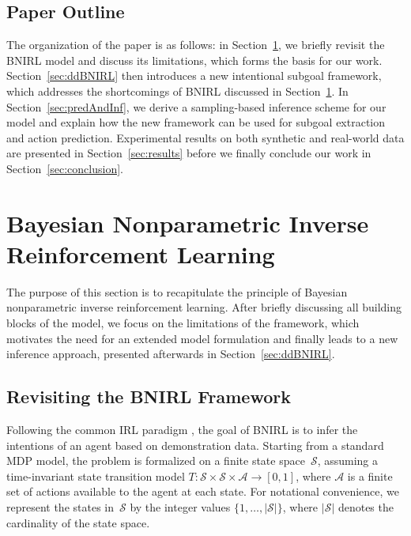 \documentclass[twoside,11pt]{article}
\begin{document}
\subsection{Paper Outline}
%
The organization %
of the %
paper is as follows: in Section~\ref{sec:BNIRL}, we briefly revisit the BNIRL model and discuss its limitations, which forms the basis for our work. %
Section~\ref{sec:ddBNIRL} then introduces a new intentional subgoal framework, which addresses the %
shortcomings of BNIRL discussed in Section~\ref{sec:BNIRL}. In Section~\ref{sec:predAndInf}, we derive a sampling-based inference scheme for our model and explain %
how the new framework can be used for subgoal extraction and action prediction. Experimental results on both synthetic and real-world data are presented in Section~\ref{sec:results} before we finally conclude our work in Section~\ref{sec:conclusion}.



\section{Bayesian Nonparametric Inverse Reinforcement Learning}
\label{sec:BNIRL}

The purpose of this section is to recapitulate the principle of Bayesian nonparametric inverse reinforcement learning. After briefly discussing all building blocks of the model, we focus on the limitations of the framework, which motivates the need for an extended model formulation and finally leads to a new inference approach, presented afterwards in Section~\ref{sec:ddBNIRL}.

%
%
%
%
%
%
%
%
%
%
%
%
%
%
%
%
%
%
%
%
%
%
%
%



\subsection{Revisiting the BNIRL Framework}
\label{sec:BNIRLrefresher}


Following the common IRL paradigm \citep{ng2000algorithms,zhifei2012}, the goal of BNIRL is to %
%
infer %
the intentions %
of an agent %
%
based on demonstration data. 
%
%
%
Starting from a standard 
MDP model, the %
problem is formalized on  
%
a finite state space~$\mathcal{S}$, assuming a %
time-invariant state transition model $T:\mathcal{S}\times\mathcal{S}\times\mathcal{A}\rightarrow[0,1]$, %
%
%
where $\mathcal{A}$ is a finite set of actions available to the agent
at each state. %
%
For notational convenience, we represent the states in~$\mathcal{S}$ by the integer values $\{1,\ldots,|\mathcal{S}|\}$, where $|\mathcal{S}|$ denotes the cardinality of %
the state space.
\end{document}
